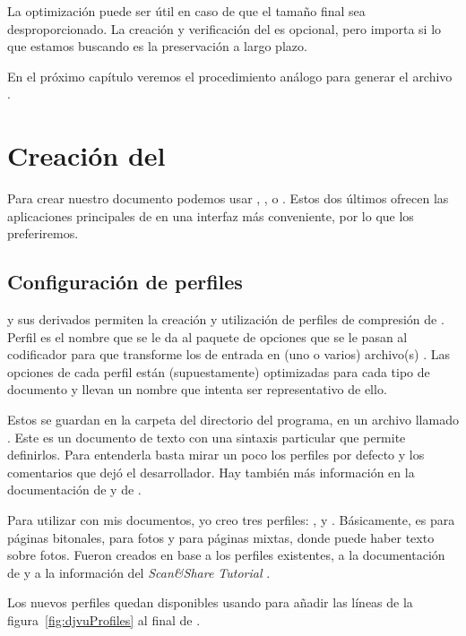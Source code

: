 \documentclass[%
	a5paper,
	10pt,
	twoside,
	openright,
	final,
]{memoir}
\begin{document}
{	La optimización puede ser útil en caso de que el tamaño final sea desproporcionado. La creación y verificación del \pdfa es opcional, pero importa si lo que estamos buscando es la preservación a largo plazo.

	En el próximo capítulo veremos el procedimiento análogo para generar el archivo \djvu.

	\chapter{Creación del \texorpdfstring{\djvu}{DjVu}} Para crear nuestro documento \djvu podemos usar \djvulibre, \dexpress, \djvusmall o \djvusmallmod. Estos dos últimos ofrecen las aplicaciones principales de \dexpress en una interfaz más conveniente, por lo que los preferiremos.

	\section{Configuración de perfiles\label{sec:profiles}} \dexpress y sus derivados permiten la creación y utilización de perfiles de compresión de \djvu. Perfil es el nombre que se le da al paquete de opciones que se le pasan al codificador para que transforme los \tiff de entrada en (uno o varios) archivo(s) \djvu. Las opciones de cada perfil están (supuestamente) optimizadas para cada tipo de documento y llevan un nombre que intenta ser representativo de ello.

	Estos se guardan en la carpeta  del directorio del programa, en un archivo llamado . Este es un documento de texto con una sintaxis particular que permite definirlos. Para entenderla basta mirar un poco los perfiles por defecto y los comentarios que dejó el desarrollador. Hay también más información en la documentación de \dexpress y de \djvusmallmod.

	Para utilizar con mis documentos, yo creo tres perfiles: ,  y . Básicamente,  es para páginas bitonales,  para fotos y  para páginas mixtas, donde puede haber texto sobre fotos. Fueron creados en base a los perfiles existentes, a la documentación de \dexpress y a la información del \emph{Scan\&Share Tutorial} \cite{ScanAndShare2008}.

	Los nuevos perfiles quedan disponibles usando \notepad para añadir las líneas de la figura~\ref{fig:djvuProfiles} al final de .

}
\end{document}
